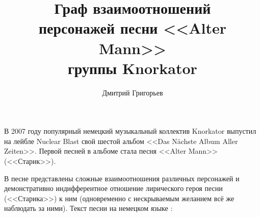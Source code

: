 \documentclass[a4paper,12pt,notitlepage]{article}
\author{Дмитрий Григорьев}
\title{Граф взаимоотношений\\персонажей песни <<Alter Mann>>\\группы Knorkator}
\begin{document}
  \maketitle

  В 2007 году популярный немецкий музыкальный коллектив Knorkator выпустил на лейбле Nuclear Blast свой шестой альбом <<Das Nächste Album Aller Zeiten>>. Первой песней в альбоме стала песня <<Alter Mann>> (<<Старик>>).

  В песне представлены сложные взаимоотношения различных персонажей и демонстративно индифферентное отношение лирического героя песни (<<Старика>>) к ним (одновременно с нескрываемым желанием всё же наблюдать за ними). Текст песни на немецком языке \cite{knorkator01}:
  
  \settowidth{\versewidth}{Doch Pech denn er ist schon länger}
\end{document}
